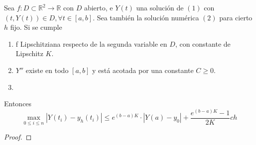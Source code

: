 \begin{theorem}
    Sea $f:D\subset \mathbb{R}^2\rightarrow \mathbb{R}$ con $D$ abierto, e $Y(t)$ una solución de $(1)$ con $(t,Y(t))\in D,\forall t\in[a,b]$. Sea también la solución numérica $(2)$ para cierto $h$ fijo. Si se cumple
    \begin{enumerate}[label=(\alph*)]
        \item f Lipschitziana respecto de la segunda variable en $D$, con constante de Lipschitz $K$.
        \item $Y''$ existe en todo $[a,b]$ y está acotada por una constante $C\geq 0$.
        \item 
    \end{enumerate}
    Entonces $$\max_{0\leq i \leq n}|Y(t_i)-y_h(t_i)| \leq e^{(b-a)K}\cdot |Y(a)-y_0| + \frac{e^{(b-a)K}-1}{2K}ch$$

\end{theorem}
\begin{proof}

\end{proof}

